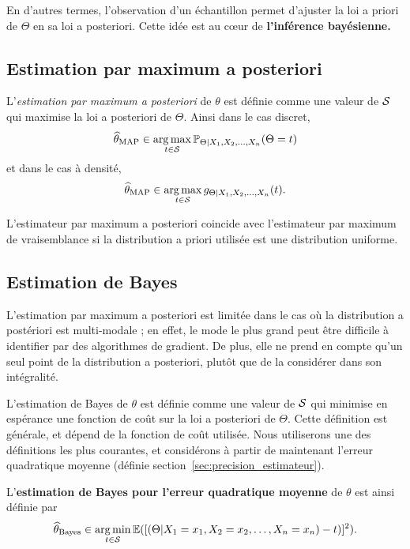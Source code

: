 En d'autres termes, l'observation d'un échantillon permet d'ajuster la loi a
priori de $\Theta$ en sa loi a posteriori. Cette idée est au c\oe{}ur
de \textbf{l'inférence bayésienne.}

\subsection{Estimation par maximum a posteriori}

L'\textit{estimation par maximum a posteriori} de $\theta$ est définie comme
une valeur de $\mathcal{S}$ qui maximise la loi a posteriori de $\Theta$. Ainsi dans
le cas discret,
\begin{equation}
  \label{eq:map_discret}
  \widehat{\theta}_{\text{MAP}} \in \operatorname*{arg\,max}_{t \in \mathcal{S}} \mathbb{P}_{\Theta|X_1, X_2, \dots, X_n}(\Theta=t)
\end{equation}
et dans le cas à densité,
\begin{equation}
  \label{eq:map_densite}
  \widehat{\theta}_{\text{MAP}} \in \operatorname*{arg\,max}_{t \in \mathcal{S}} g_{\Theta|X_1, X_2, \dots, X_n}(t).
\end{equation}
   
L'estimateur par maximum a posteriori coincide avec l'estimateur par
maximum de vraisemblance si la distribution a priori utilisée est une
distribution uniforme.
  

\subsection{Estimation de Bayes}
L'estimation par maximum a posteriori est limitée dans le cas où la
distribution a postériori est multi-modale ; en effet, le mode le plus grand
peut être difficile à identifier par des algorithmes de gradient. De plus, elle
ne prend en compte qu'un seul point de la distribution a posteriori, plutôt que
de la considérer dans son intégralité.

L'estimation de Bayes de $\theta$ est définie comme une valeur de $\mathcal{S}$ qui
minimise en espérance une fonction de coût sur la loi a posteriori de $\Theta$.
Cette définition est
générale, et dépend de la fonction de coût utilisée. %
Nous utiliserons
une des définitions les plus courantes, et considérons à partir de maintenant
l'erreur quadratique moyenne (définie section~\ref{sec:precision_estimateur}). 

L'\textbf{estimation de Bayes pour l'erreur quadratique moyenne} de $\theta$
est ainsi définie par
\begin{equation}
  \label{eq:bayes_estimator}
  \widehat{\theta}_{\text{Bayes}} \in \operatorname*{arg\,min}_{t \in \mathcal{S}} \mathbb{E}([(\Theta|X_1=x_1, X_2=x_2, \dots, X_n=x_n) - t)]^2).
\end{equation}


